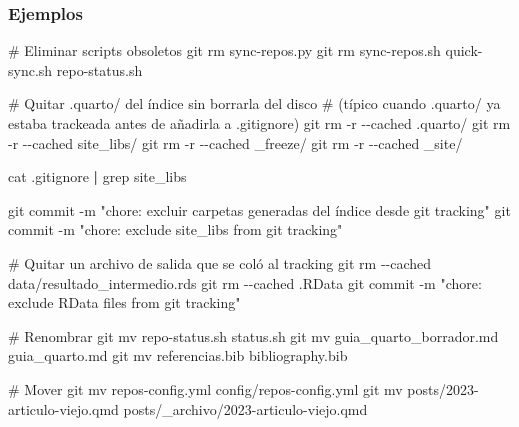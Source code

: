 \documentclass[
  doc,
  floatsintext,
  longtable,
  a4paper,
  nolmodern,
  notxfonts,
  notimes,
  12pt,
  colorlinks=true,linkcolor=blue,citecolor=blue,urlcolor=blue]{apa7}
\newenvironment{Shaded}{\begin{snugshade}}{\end{snugshade}}
\newcommand{\AttributeTok}[1]{\textcolor[rgb]{0.40,0.45,0.13}{#1}}
\newcommand{\CommentTok}[1]{\textcolor[rgb]{0.37,0.37,0.37}{#1}}
\newcommand{\FunctionTok}[1]{\textcolor[rgb]{0.28,0.35,0.67}{#1}}
\newcommand{\KeywordTok}[1]{\textcolor[rgb]{0.00,0.23,0.31}{\textbf{#1}}}
\newcommand{\NormalTok}[1]{\textcolor[rgb]{0.00,0.23,0.31}{#1}}
\newcommand{\StringTok}[1]{\textcolor[rgb]{0.13,0.47,0.30}{#1}}
\begin{document}
\subsubsection{Ejemplos}\label{ejemplos}

\begin{Shaded}
\begin{Highlighting}[]
\CommentTok{\# Eliminar scripts obsoletos}
\FunctionTok{git}\NormalTok{ rm sync{-}repos.py}
\FunctionTok{git}\NormalTok{ rm sync{-}repos.sh quick{-}sync.sh repo{-}status.sh}

\CommentTok{\# Quitar .quarto/ del índice sin borrarla del disco}
\CommentTok{\# (típico cuando .quarto/ ya estaba trackeada antes de añadirla a .gitignore)}
\FunctionTok{git}\NormalTok{ rm }\AttributeTok{{-}r} \AttributeTok{{-}{-}cached}\NormalTok{ .quarto/}
\FunctionTok{git}\NormalTok{ rm }\AttributeTok{{-}r} \AttributeTok{{-}{-}cached}\NormalTok{ site\_libs/}
\FunctionTok{git}\NormalTok{ rm }\AttributeTok{{-}r} \AttributeTok{{-}{-}cached}\NormalTok{ \_freeze/}
\FunctionTok{git}\NormalTok{ rm }\AttributeTok{{-}r} \AttributeTok{{-}{-}cached}\NormalTok{ \_site/}

\FunctionTok{cat}\NormalTok{ .gitignore }\KeywordTok{|} \FunctionTok{grep}\NormalTok{ site\_libs}

\FunctionTok{git}\NormalTok{ commit }\AttributeTok{{-}m} \StringTok{"chore: excluir carpetas generadas del índice desde git tracking"}
\FunctionTok{git}\NormalTok{ commit }\AttributeTok{{-}m} \StringTok{"chore: exclude site\_libs from git tracking"}

\CommentTok{\# Quitar un archivo de salida que se coló al tracking}
\FunctionTok{git}\NormalTok{ rm }\AttributeTok{{-}{-}cached}\NormalTok{ data/resultado\_intermedio.rds}
\FunctionTok{git}\NormalTok{ rm }\AttributeTok{{-}{-}cached}\NormalTok{ .RData}
\FunctionTok{git}\NormalTok{ commit }\AttributeTok{{-}m} \StringTok{"chore: exclude RData files from git tracking"}

\CommentTok{\# Renombrar}
\FunctionTok{git}\NormalTok{ mv repo{-}status.sh status.sh }
\FunctionTok{git}\NormalTok{ mv guia\_quarto\_borrador.md guia\_quarto.md}
\FunctionTok{git}\NormalTok{ mv referencias.bib bibliography.bib}

\CommentTok{\# Mover}
\FunctionTok{git}\NormalTok{ mv repos{-}config.yml config/repos{-}config.yml }
\FunctionTok{git}\NormalTok{ mv posts/2023{-}articulo{-}viejo.qmd posts/\_archivo/2023{-}articulo{-}viejo.qmd}
\end{Highlighting}
\end{Shaded}
\end{document}
